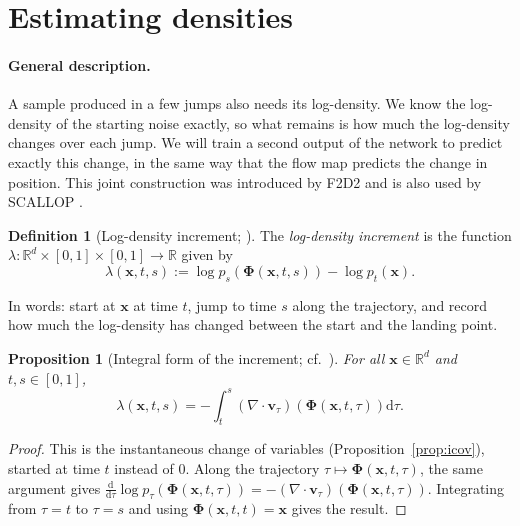 \documentclass[11pt,a4paper]{article}
\numberwithin{equation}{section}     %
\theoremstyle{plain}        %
\newtheorem{proposition}[theorem]{Proposition}
\theoremstyle{definition}   %
\newtheorem{definition}[theorem]{Definition}
\theoremstyle{remark}       %
\begin{document}
\newpage

\section{Estimating densities}\label{sec:densities}

\paragraph{General description.} A sample produced in a few jumps also needs its log-density. We know the log-density of the starting noise exactly, so what remains is how much the log-density changes over each jump. We will train a second output of the network to predict exactly this change, in the same way that the flow map predicts the change in position. This joint construction was introduced by F2D2 \citep{ai2026} and is also used by SCALLOP \citep{ouyang2026}.

\begin{definition}[Log-density increment; \citealp{ai2026,ouyang2026}]\label{def:lambda}
The \emph{log-density increment} is the function $\lambda:\mathbb{R}^d\times[0,1]\times[0,1]\to\mathbb{R}$ given by
\[
\lambda(\mathbf{x},t,s):=\log p_s\left(\boldsymbol{\Phi}(\mathbf{x},t,s)\right)-\log p_t(\mathbf{x}).
\]
\end{definition}

In words: start at $\mathbf{x}$ at time $t$, jump to time $s$ along the trajectory, and record how much the log-density has changed between the start and the landing point.

\begin{proposition}[Integral form of the increment; cf.\ \citealp{chen2018}]\label{prop:lambdaint}
For all $\mathbf{x}\in\mathbb{R}^d$ and $t,s\in[0,1]$,
\[
\lambda(\mathbf{x},t,s)=-\int_t^s\left(\nabla\cdot\mathbf{v}_\tau\right)\left(\boldsymbol{\Phi}(\mathbf{x},t,\tau)\right)\mathrm{d}\tau .
\]
\end{proposition}

\begin{proof}
This is the instantaneous change of variables (Proposition~\ref{prop:icov}), started at time $t$ instead of $0$. Along the trajectory $\tau\mapsto\boldsymbol{\Phi}(\mathbf{x},t,\tau)$, the same argument gives $\frac{\mathrm{d}}{\mathrm{d}\tau}\log p_\tau\left(\boldsymbol{\Phi}(\mathbf{x},t,\tau)\right)=-\left(\nabla\cdot\mathbf{v}_\tau\right)\left(\boldsymbol{\Phi}(\mathbf{x},t,\tau)\right)$. Integrating from $\tau=t$ to $\tau=s$ and using $\boldsymbol{\Phi}(\mathbf{x},t,t)=\mathbf{x}$ gives the result.
\end{proof}
\end{document}
